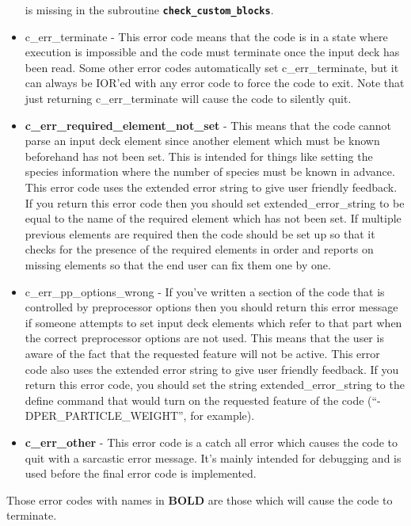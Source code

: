 \documentclass[12pt,a4paper]{article}
\newcommand{\inlinecode}[1]{{\color{warwickred} \bf\texttt{#1}}}
\begin{document}
\begin{itemize}
  is missing in the subroutine \inlinecode{check\_custom\_blocks}.
\item c\_err\_terminate - This error code means that the code is in a state
  where execution is impossible and the code must terminate once the input deck
  has been read. Some other error codes automatically set c\_err\_terminate,
  but it can always be IOR'ed with any error code to force the code to exit.
  Note that just returning c\_err\_terminate will cause the code to
  silently quit.
\item {\bf c\_err\_required\_element\_not\_set} - This means that the code
  cannot parse an input deck element since another element which must be known
  beforehand has not been set. This is intended for things like setting the
  species information where the number of species must be known in
  advance. This error code uses the extended error string to give user friendly
  feedback. If you return this error code then you should set
  extended\_error\_string to be equal to the name of the required element which
  has not been set. If multiple previous elements are required then the code
  should be set up so that it checks for the presence of the required elements
  in order and reports on missing elements so that the end user can fix them
  one by one.
\item c\_err\_pp\_options\_wrong - If you've written a section of the code that
  is controlled by preprocessor options then you should return this
  error message if someone attempts to set input deck elements which refer to
  that part when the correct preprocessor options are not used. This means that
  the user is aware of the fact that the requested feature will not be
  active. This error code also uses the extended error string to give user
  friendly feedback. If you return this error code, you should set the string
  extended\_error\_string to the define command that would turn on the
  requested feature of the code (``-DPER\_PARTICLE\_WEIGHT'', for example).
\item {\bf c\_err\_other} - This error code is a catch all error which causes
  the code to quit with a sarcastic error message. It's mainly intended for
  debugging and is used before the final error code is implemented.
\end{itemize}

Those error codes with names in {\bf BOLD} are those which will cause the code
to terminate.
\end{document}
